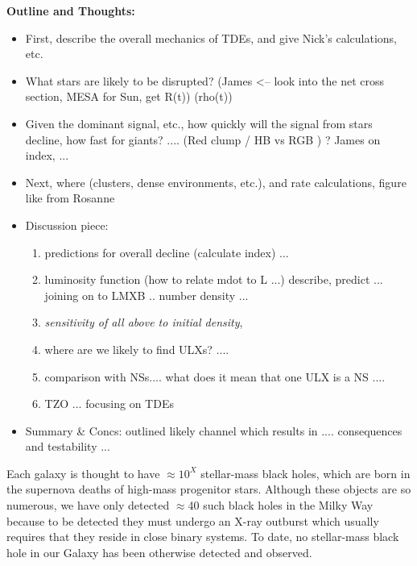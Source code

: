 \bf{Outline and Thoughts:}\\
\begin{itemize}
\item First, describe the overall mechanics of TDEs, and give Nick's calculations, etc. \\
\item What stars are likely to be disrupted?  (James <-- look into the net cross section, MESA for Sun, get R(t)) (rho(t)) \\
\item Given the dominant signal, etc., how quickly will the signal from stars decline, how fast for giants? .... (Red clump / HB vs RGB ) ?  James on index, ... \\ 
\item Next, where (clusters, dense environments, etc.), and rate calculations, figure like from Rosanne \\
\item Discussion piece: 
\begin{enumerate}
    \item predictions for overall decline (calculate index) ... 
    \item luminosity function (how to relate mdot to L ...) describe, predict  ... joining on to LMXB .. number density ... 
    \item {\it sensitivity of all above to initial density},  
    \item where are we likely to find ULXs? .... 
    \item comparison with NSs.... what does it mean that one ULX is a NS .... 
    \item TZO ... focusing on TDEs 
    \end{enumerate}
    
\item Summary & Concs: outlined likely channel which results in .... consequences and testability ... 
\end{itemize}






Each galaxy is thought to have $\approx 10^X$ stellar-mass black
holes, which are born in the supernova deaths of high-mass progenitor
stars.  Although these objects are so numerous, we have only detected
$\approx$40 such black holes in the Milky Way because to be detected
they must undergo an X-ray outburst which usually requires that they
reside in close binary systems.  To date, no stellar-mass black hole
in our Galaxy has been otherwise detected and observed.


